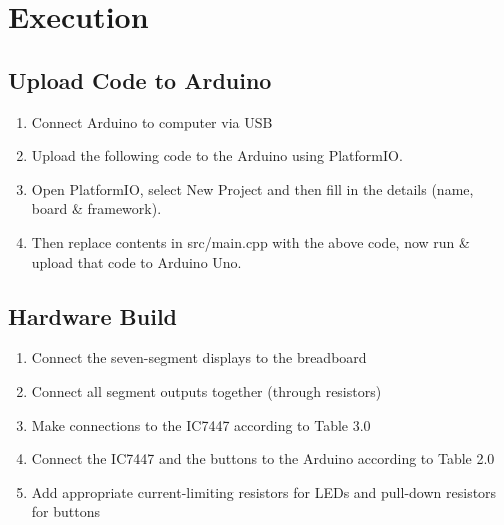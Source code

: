 \section{Execution}
\subsection{Upload Code to Arduino}
\begin{enumerate}
    \item Connect Arduino to computer via USB
    \item Upload the following code to the Arduino using PlatformIO.
\item Open PlatformIO, select New Project and then fill in the details (name, board \& framework).
\item Then replace contents in src/main.cpp with the above code, now run \& upload that code to Arduino Uno.
\end{enumerate}

\subsection{Hardware Build}
\begin{enumerate}
    \item Connect the seven-segment displays to the breadboard
    \item Connect all segment outputs together (through resistors)
    \item Make connections to the IC7447 according to Table 3.0
    \item Connect the IC7447 and the buttons to the Arduino according to Table 2.0
    \item Add appropriate current-limiting resistors for LEDs and pull-down resistors for buttons
\end{enumerate}

